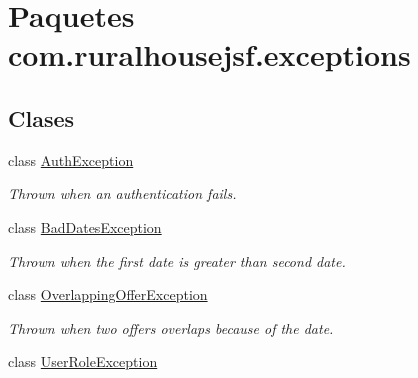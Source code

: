 \hypertarget{a00118}{}\section{Paquetes com.\+ruralhousejsf.\+exceptions}
\label{a00118}
\subsection*{Clases}
\begin{DoxyCompactItemize}
\item 
class \mbox{\hyperlink{a00204}{Auth\+Exception}}
\begin{DoxyCompactList}\small\item\em Thrown when an authentication fails. \end{DoxyCompactList}\item 
class \mbox{\hyperlink{a00208}{Bad\+Dates\+Exception}}
\begin{DoxyCompactList}\small\item\em Thrown when the first date is greater than second date. \end{DoxyCompactList}\item 
class \mbox{\hyperlink{a00212}{Overlapping\+Offer\+Exception}}
\begin{DoxyCompactList}\small\item\em Thrown when two offers overlaps because of the date. \end{DoxyCompactList}\item 
class \mbox{\hyperlink{a00216}{User\+Role\+Exception}}
\end{DoxyCompactItemize}
